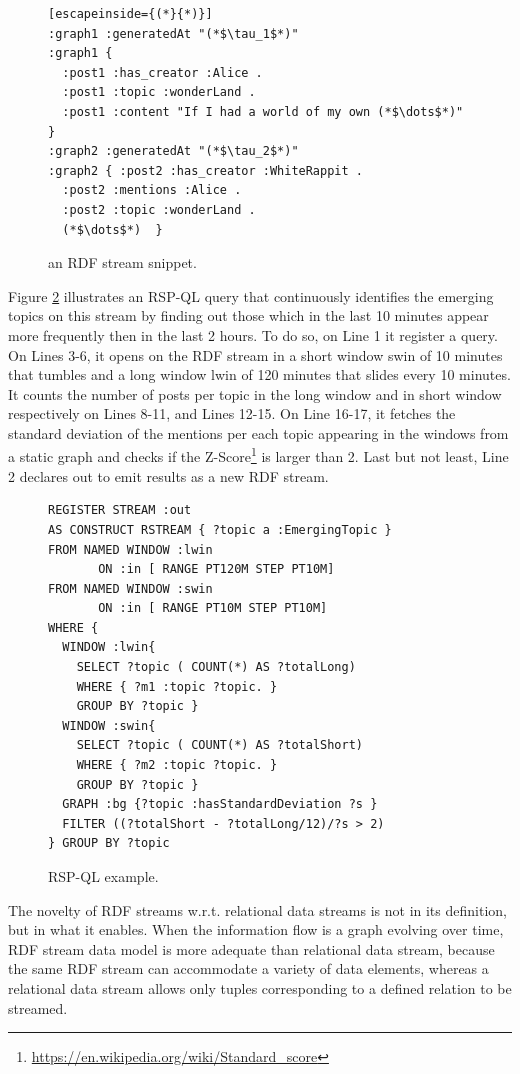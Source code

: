 \begin{figure}[!h]
\begin{lstlisting}[escapeinside={(*}{*)}]
:graph1 :generatedAt "(*$\tau_1$*)"
:graph1 { 
  :post1 :has_creator :Alice .
  :post1 :topic :wonderLand .
  :post1 :content "If I had a world of my own (*$\dots$*)" }
:graph2 :generatedAt "(*$\tau_2$*)" 
:graph2 { :post2 :has_creator :WhiteRappit .
  :post2 :mentions :Alice .
  :post2 :topic :wonderLand .
  (*$\dots$*)  }  
\end{lstlisting}
\vspace*{-4mm}
\caption{\label{fig:rdfstream}an RDF stream snippet.}
\end{figure}

Figure \ref{fig:rspql} illustrates an RSP-QL query that continuously identifies the emerging topics on this stream by finding out those which in the last 10 minutes appear more frequently then in the last 2 hours. To do so, on Line 1 it register a query. On Lines 3-6, it opens on the RDF stream \textsf{in} a short window \textsf{swin} of 10 minutes that tumbles and a long window \textsf{lwin} of 120 minutes that slides every 10 minutes. It counts the number of posts per topic in the long window and in short window respectively on Lines 8-11, and Lines 12-15. On Line 16-17, it fetches the standard deviation of the mentions per each topic appearing in the windows from a static graph and checks if the Z-Score\footnote{\url{https://en.wikipedia.org/wiki/Standard_score}} is larger than 2. Last but not least, Line 2 declares out to emit results as a new RDF stream.

\begin{figure}[!h]
\begin{lstlisting}[language=rsp-ql]
REGISTER STREAM :out
AS CONSTRUCT RSTREAM { ?topic a :EmergingTopic }
FROM NAMED WINDOW :lwin 
       ON :in [ RANGE PT120M STEP PT10M]
FROM NAMED WINDOW :swin 
       ON :in [ RANGE PT10M STEP PT10M]
WHERE { 
  WINDOW :lwin{
    SELECT ?topic ( COUNT(*) AS ?totalLong)
    WHERE { ?m1 :topic ?topic. }
    GROUP BY ?topic }
  WINDOW :swin{
    SELECT ?topic ( COUNT(*) AS ?totalShort)
    WHERE { ?m2 :topic ?topic. }
    GROUP BY ?topic }
  GRAPH :bg {?topic :hasStandardDeviation ?s }
  FILTER ((?totalShort - ?totalLong/12)/?s > 2)
} GROUP BY ?topic
\end{lstlisting}
\vspace*{-4mm}
\caption{\label{fig:rspql}RSP-QL example.}
\end{figure}

The novelty of RDF streams w.r.t. relational data streams is not in its definition, but in what it enables. When the information flow is a graph evolving over time, RDF stream data model is more adequate than relational data stream, because the same RDF stream can accommodate a variety of data elements, whereas a relational data stream allows only tuples corresponding to a defined relation to be streamed. 

